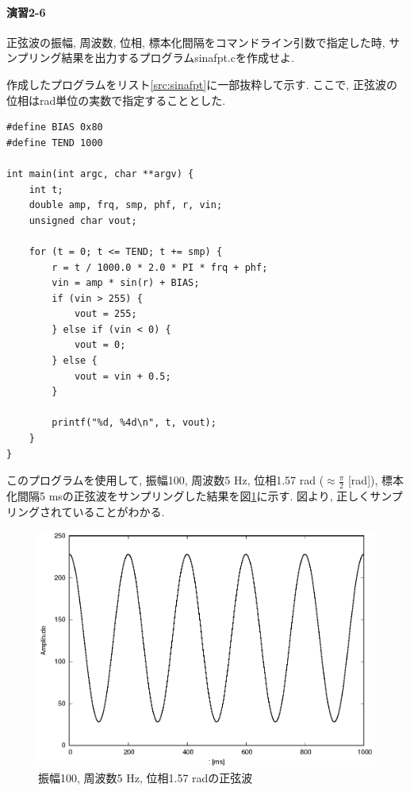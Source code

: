 \documentclass[titlepage]{jsarticle}
\begin{document}
    \paragraph{演習2-6} 正弦波の振幅, 周波数, 位相, 標本化間隔をコマンドライン引数で指定した時,
    サンプリング結果を出力するプログラムsinafpt.cを作成せよ.

        作成したプログラムをリスト\ref{src:sinafpt}に一部抜粋して示す.
        ここで, 正弦波の位相はrad単位の実数で指定することとした.

        \begin{lstlisting}[caption=sinafpt.c, label=src:sinafpt]
#define BIAS 0x80
#define TEND 1000

int main(int argc, char **argv) {
    int t;
    double amp, frq, smp, phf, r, vin;
    unsigned char vout;

    for (t = 0; t <= TEND; t += smp) {
        r = t / 1000.0 * 2.0 * PI * frq + phf;
        vin = amp * sin(r) + BIAS;
        if (vin > 255) {
            vout = 255;
        } else if (vin < 0) {
            vout = 0;
        } else {
            vout = vin + 0.5;
        }

        printf("%d, %4d\n", t, vout);
    }
}\end{lstlisting}

        このプログラムを使用して, 振幅100, 周波数5 Hz,
        位相1.57 rad ($\displaystyle\approx \frac{\pi}{2}$ [rad]),
        標本化間隔5 msの正弦波をサンプリングした結果を図\ref{fig:sinafpt}に示す.
        図より, 正しくサンプリングされていることがわかる.

        \begin{figure}[h]
            \centering
            \includegraphics[width=0.8\hsize]{images/sin.eps}
            \caption{振幅100, 周波数5 Hz, 位相1.57 radの正弦波}
            \label{fig:sinafpt}
        \end{figure}
    
\end{document}
